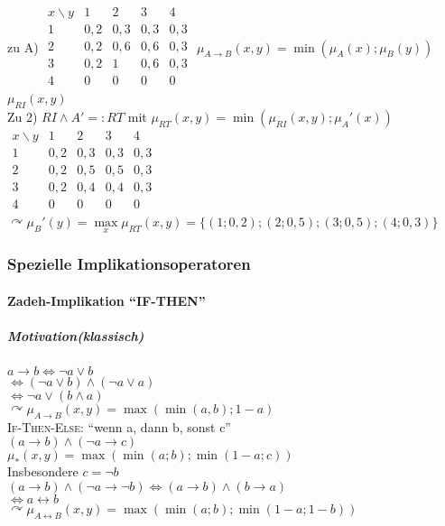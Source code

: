 \documentclass[a4paper]{scrartcl}
\begin{document}
zu A) $\begin{array}{c|c|c|c|c}
x \backslash y & 1 & 2 & 3 & 4\\ \hline
1 & 0,2 & 0,3 & 0,3 & 0,3\\
2 & 0,2 & 0,6 & 0,6 & 0,3\\
3 & 0,2 & 1 & 0,6 & 0,3\\
4 & 0 & 0 & 0 & 0\\
\end{array}$
$\mu_{A \rightarrow B} (x,y) = \min (\mu_A(x);\mu_B(y))$\\
$\mu_{RI} (x,y)$\\
Zu 2) $RI \wedge A' =: RT$ mit $\mu_{RT}(x,y) = \min (\mu_{RI} (x,y); \mu_A'(x))$\\
$\begin{array}{c|c|c|c|c}
x \backslash y & 1 & 2 & 3 & 4\\ \hline
1 & 0,2 & 0,3 & 0,3 & 0,3 \\
2 & 0,2 & 0,5 & 0,5 & 0,3\\
3 & 0,2 & 0,4 & 0,4 & 0,3\\
4 & 0 & 0 & 0 & 0\\
\end{array}$\\
$\curvearrowright \mu_B' (y) = \max\limits_x \mu_{RT} (x,y) = \{(1;0,2);(2;0,5);(3;0,5);(4;0,3)\}$

\subsubsection{Spezielle Implikationsoperatoren}
\paragraph{Zadeh-Implikation "`IF-THEN"'}
\subparagraph{Motivation(klassisch)} $a \rightarrow b \Leftrightarrow \neg a \vee b$\\
$\Leftrightarrow (\neg a \vee b) \wedge (\neg a \vee a)$\\
$\Leftrightarrow \neg a \vee (b \wedge a)$\\
$\curvearrowright \mu_{A \rightarrow B} (x,y) = \max (\min (a,b); 1-a)$\\
\textsc{If-Then-Else}: "`wenn a, dann b, sonst c"'\\
$(a \rightarrow b) \wedge (\neg a \rightarrow c)$\\
$\mu_\ast (x,y) = \max (\min (a;b); \min (1-a;c))$\\
Insbesondere $c = \neg b$\\
$(a \rightarrow b) \wedge (\neg a \rightarrow \neg b) \Leftrightarrow (a \rightarrow b) \wedge (b \rightarrow a)$\\
$\Leftrightarrow a \leftrightarrow b$\\
$\curvearrowright \mu_{A \leftrightarrow B} (x,y) = \max ( \min (a;b); \min (1-a;1-b))$
\end{document}
